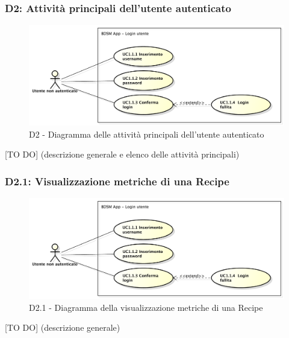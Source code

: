		\subsubsection{D2: Attività principali dell'utente autenticato} %
		\label{ssub:attivita_principali_dell_utente_autenticato}
		\begin{figure}[!htbp]
			\centering
			\centerline{\includegraphics[scale=0.45]{./images/UC1_1.pdf}}
			\caption{D2 - Diagramma delle attività principali dell'utente autenticato}
		\end{figure}
		[TO DO] (descrizione generale e elenco delle attività principali)


		\subsubsection{D2.1: Visualizzazione metriche di una Recipe} %
		\label{ssub:visualizzazione_metriche_di_una_recipe}
		\label{ssub:registrazione_al_sistema}
		\begin{figure}[!htbp]
			\centering
			\centerline{\includegraphics[scale=0.45]{./images/UC1_1.pdf}}
			\caption{D2.1 - Diagramma della visualizzazione metriche di una Recipe}
		\end{figure}
		[TO DO] (descrizione generale)

